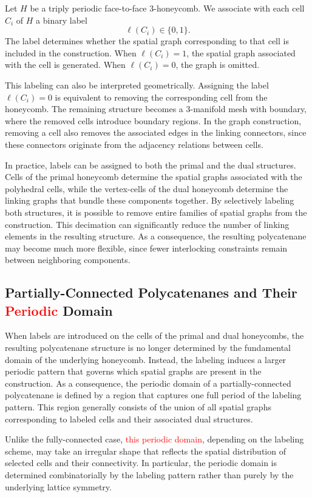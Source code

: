 \documentclass[times,twocolumn,final]{elsarticle}
\begin{document}
Let $H$ be a triply periodic face-to-face 3-honeycomb. We associate with
each cell $C_i$ of $H$ a binary label
\[
\ell(C_i) \in \{0,1\}.
\]
The label determines whether the spatial graph corresponding to that cell
is included in the construction. When $\ell(C_i)=1$, the spatial graph
associated with the cell is generated. When $\ell(C_i)=0$, the graph is
omitted.

This labeling can also be interpreted geometrically. Assigning the label
$\ell(C_i)=0$ is equivalent to removing the corresponding cell from the
honeycomb. The remaining structure becomes a 3-manifold mesh with boundary,
where the removed cells introduce boundary regions. In the graph
construction, removing a cell also removes the associated edges in the linking
connectors, since these connectors originate from the adjacency relations
between cells.

In practice, labels can be assigned to both the primal and the dual
structures. Cells of the primal honeycomb determine the spatial graphs
associated with the polyhedral cells, while the vertex-cells of the dual
honeycomb determine the linking graphs that bundle these components
together. By selectively labeling both structures, it is possible to remove
entire families of spatial graphs from the construction. This decimation can
significantly reduce the number of linking elements in the resulting
structure. As a consequence, the resulting polycatenane may become much more
flexible, since fewer interlocking constraints remain between neighboring
components.

\subsection{Partially-Connected Polycatenanes and Their \textcolor{red}{Periodic} Domain}

When labels are introduced on the cells of the primal and dual honeycombs, the resulting polycatenane structure is no longer determined by the fundamental domain of the underlying honeycomb. Instead, the labeling induces a larger periodic pattern that governs which spatial graphs are present in the construction.
As a consequence, the periodic domain of a partially-connected polycatenane is defined by a region that captures one full period of the labeling pattern. This region generally consists of the union of all spatial graphs corresponding to labeled cells and their associated dual structures.

Unlike the fully-connected case, \textcolor{red}{this periodic domain}, depending on the labeling scheme, may take an irregular shape that reflects the spatial distribution of selected cells and their connectivity. In particular, the periodic domain is determined combinatorially by the labeling pattern rather than purely by the underlying lattice symmetry.
\end{document}
